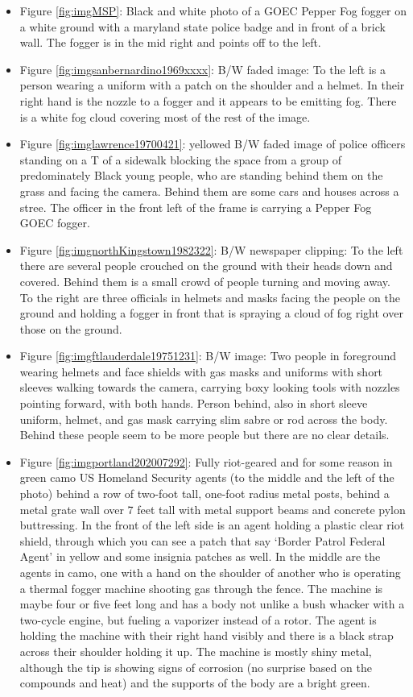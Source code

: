 \documentclass[
  11pt,
]{krantz}
\begin{document}
\begin{itemize}
\item
  Figure \ref{fig:imgMSP}: Black and white photo of a GOEC Pepper Fog fogger on a white ground with a maryland state police badge and in front of a brick wall. The fogger is in the mid right and points off to the left.
\item
  Figure \ref{fig:imgsanbernardino1969xxxx}: B/W faded image: To the left is a person wearing a uniform with a patch on the shoulder and a helmet. In their right hand is the nozzle to a fogger and it appears to be emitting fog. There is a white fog cloud covering most of the rest of the image.
\item
  Figure \ref{fig:imglawrence19700421}: yellowed B/W faded image of police officers standing on a T of a sidewalk blocking the space from a group of predominately Black young people, who are standing behind them on the grass and facing the camera. Behind them are some cars and houses across a stree. The officer in the front left of the frame is carrying a Pepper Fog GOEC fogger.
\item
  Figure \ref{fig:imgnorthKingstown1982322}: B/W newspaper clipping: To the left there are several people crouched on the ground with their heads down and covered. Behind them is a small crowd of people turning and moving away. To the right are three officials in helmets and masks facing the people on the ground and holding a fogger in front that is spraying a cloud of fog right over those on the ground.
\item
  Figure \ref{fig:imgftlauderdale19751231}: B/W image: Two people in foreground wearing helmets and face shields with gas masks and uniforms with short sleeves walking towards the camera, carrying boxy looking tools with nozzles pointing forward, with both hands. Person behind, also in short sleeve uniform, helmet, and gas mask carrying slim sabre or rod across the body. Behind these people seem to be more people but there are no clear details.
\item
  Figure \ref{fig:imgportland202007292}: Fully riot-geared and for some reason in green camo US Homeland Security agents (to the middle and the left of the photo) behind a row of two-foot tall, one-foot radius metal posts, behind a metal grate wall over 7 feet tall with metal support beams and concrete pylon buttressing. In the front of the left side is an agent holding a plastic clear riot shield, through which you can see a patch that say `Border Patrol Federal Agent' in yellow and some insignia patches as well. In the middle are the agents in camo, one with a hand on the shoulder of another who is operating a thermal fogger machine shooting gas through the fence. The machine is maybe four or five feet long and has a body not unlike a bush whacker with a two-cycle engine, but fueling a vaporizer instead of a rotor. The agent is holding the machine with their right hand visibly and there is a black strap across their shoulder holding it up. The machine is mostly shiny metal, although the tip is showing signs of corrosion (no surprise based on the compounds and heat) and the supports of the body are a bright green.

\end{itemize}
\end{document}
